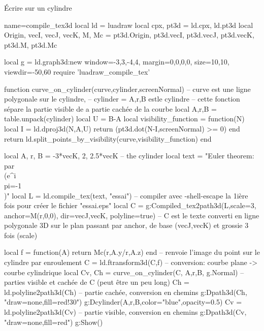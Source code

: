\begin{demo}{Écrire sur un cylindre}
\begin{luadraw}{name=compile_tex3d}
local ld = luadraw
local cpx, pt3d = ld.cpx, ld.pt3d
local Origin, vecI, vecJ, vecK, M, Mc = pt3d.Origin, pt3d.vecI, pt3d.vecJ, pt3d.vecK, pt3d.M, pt3d.Mc

local g = ld.graph3d:new{ window={-3,3,-4,4}, margin={0,0,0,0}, size={10,10}, viewdir={-50,60}}
require 'luadraw_compile_tex'

function curve_on_cylinder(curve,cylinder,screenNormal) 
-- curve est une ligne polygonale sur le cylindre,
-- cylinder = {A,r,B} estle cylindre
-- cette fonction sépare la partie visible de a partie cachée de la courbe
    local A,r,B = table.unpack(cylinder)
    local U = B-A
    local visibility_function = function(N)
        local I = ld.dproj3d(N,{A,U})
        return (pt3d.dot(N-I,screenNormal) >= 0)
    end
    return ld.split_points_by_visibility(curve,visibility_function)
end

local A, r, B = -3*vecK, 2, 2.5*vecK -- the cylinder
local text = "Euler theorem: \\par \\(e^{i\\pi}=-1\\)"
local L = ld.compile_tex(text, "essai") -- compiler avec -shell-escape la 1ière fois pour créer le fichier "essai.eps"
local C = g:Compiled_tex2path3d(L,{scale=3, anchor=M(r,0,0), dir={vecJ,vecK}, polyline=true})
-- C est le texte converti en ligne polygonale 3D sur le plan passant par anchor, de base (vecJ,vecK) et grossie 3 fois (scale)

local f = function(A) return Mc(r,A.y/r,A.z) end -- renvoie l'image du point sur le cylindre par enroulement
C = ld.ftransform3d(C,f) -- conversion: courbe plane -> courbe cylindrique
local Cv, Ch = curve_on_cylinder(C, {A,r,B}, g.Normal) -- parties visible et cachée de C (peut être un peu long)
Ch = ld.polyline2path3d(Ch) -- partie cachée, conversion en chemins
g:Dpath3d(Ch, "draw=none,fill=red!30")
g:Dcylinder(A,r,B,{color="blue",opacity=0.5})
Cv = ld.polyline2path3d(Cv) -- partie visible, conversion en chemins
g:Dpath3d(Cv, "draw=none,fill=red")
g:Show()
\end{luadraw}
\end{demo}
